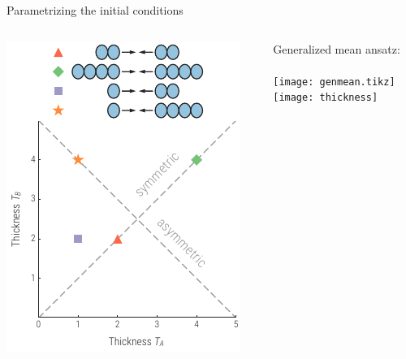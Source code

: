 \documentclass[xcolor=dvipsnames]{beamer}
\begin{document}
\begin{frame}{Parametrizing the initial conditions}
    \vfill
    \begin{columns}
        \begin{column}{0.45\textwidth}
            \vfill
            \includegraphics{mapping}
        \end{column}
        \vline
        \begin{column}{0.55\textwidth}
            \smallskip
            \centering \small Generalized mean ansatz: \\
             \\
            \medskip
            \texttt{[image: genmean.tikz]} \\
            \bigskip \smallskip
            \texttt{[image: thickness]} 
        \end{column}
    \end{columns}
\end{frame}
\end{document}
